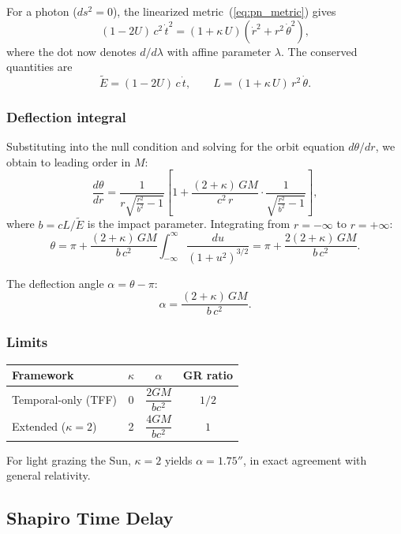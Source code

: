 \documentclass[12pt]{article}
\begin{document}
For a photon ($ds^2 = 0$), the linearized metric~(\ref{eq:pn_metric}) gives
$$
(1 - 2U)\,c^2\,\dot{t}^2 = (1 + \kappa\,U)\left(\dot{r}^2 + r^2\,\dot{\theta}^2\right),
$$
where the dot now denotes $d/d\lambda$ with affine parameter $\lambda$. The conserved quantities are
$$
\tilde{E} = (1 - 2U)\,c\,\dot{t}, \qquad L = (1 + \kappa\,U)\,r^2\,\dot{\theta}.
$$

\subsubsection{Deflection integral}

Substituting into the null condition and solving for the orbit equation $d\theta/dr$, we obtain to leading order in $M$:
$$
\frac{d\theta}{dr} = \frac{1}{r\sqrt{\frac{r^2}{b^2} - 1}}\left[1 + \frac{(2 + \kappa)\,GM}{c^2\,r} \cdot \frac{1}{\sqrt{\frac{r^2}{b^2} - 1}}\right],
$$
where $b = cL/\tilde{E}$ is the impact parameter. Integrating from $r = -\infty$ to $r = +\infty$:
$$
\theta = \pi + \frac{(2 + \kappa)\,GM}{b\,c^2}\int_{-\infty}^{\infty}\frac{du}{(1 + u^2)^{3/2}} = \pi + \frac{2(2 + \kappa)\,GM}{b\,c^2}.
$$

The deflection angle $\alpha = \theta - \pi$:
\begin{equation}
\boxed{\alpha = \frac{(2 + \kappa)\,GM}{b\,c^2}.}
\label{eq:deflection}
\end{equation}

\subsubsection{Limits}

\begin{center}
\small
\begin{tabular}{lccc}
\hline
Framework & $\kappa$ & $\alpha$ & GR ratio \\
\hline
Temporal-only (TFF) & 0 & $\dfrac{2GM}{bc^2}$ & $1/2$ \\[8pt]
Extended ($\kappa = 2$) & 2 & $\dfrac{4GM}{bc^2}$ & $1$ \\
\hline
\end{tabular}
\end{center}

For light grazing the Sun, $\kappa = 2$ yields $\alpha = 1.75''$, in exact agreement with general relativity.

\subsection{Shapiro Time Delay}
\label{sec:shapiro}
\end{document}
